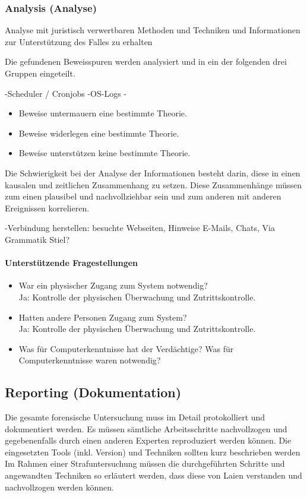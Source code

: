 \subsubsection{Analysis (Analyse)}
Analyse mit juristisch verwertbaren Methoden und Techniken und Informationen zur Unterstützung des Falles zu erhalten

Die gefundenen Beweisspuren werden analysiert und in ein der folgenden drei Gruppen eingeteilt.

-Scheduler / Cronjobs
-OS-Logs
-
\begin{itemize}
\item Beweise untermauern eine bestimmte Theorie.
\item Beweise widerlegen eine bestimmte Theorie.
\item Beweise unterstützen keine bestimmte Theorie.
\end{itemize}

Die Schwierigkeit bei der Analyse der Informationen besteht darin, diese in einen kausalen und zeitlichen Zusammenhang zu setzen. Diese Zusammenhänge müssen zum einen plausibel und nachvollziehbar sein und zum anderen mit anderen Ereignissen korrelieren. 


-Verbindung herstellen: besuchte Webseiten, Hinweise E-Mails, Chats, Via Grammatik Stiel?

\paragraph{Unterstützende Fragestellungen}
\begin{itemize}
\item War ein physischer Zugang zum System notwendig?\\
Ja: Kontrolle der physischen Überwachung und Zutrittskontrolle.
\item Hatten andere Personen Zugang zum System?\\
Ja: Kontrolle der physischen Überwachung und Zutrittskontrolle.
\item Was für Computerkenntnisse hat der Verdächtige? Was für Computerkenntnisse waren notwendig?
\end{itemize}

\subsection{Reporting (Dokumentation)}
Die gesamte forensische Untersuchung muss im Detail protokolliert und dokumentiert werden. Es müssen sämtliche Arbeitsschritte nachvollzogen und gegebenenfalls durch einen anderen Experten reproduziert werden können. Die eingesetzten Tools (inkl. Version) und Techniken sollten kurz beschrieben werden Im Rahmen einer Strafuntersuchung müssen die durchgeführten Schritte und angewandten Techniken so erläutert werden, dass diese von Laien verstanden und nachvollzogen werden können.

